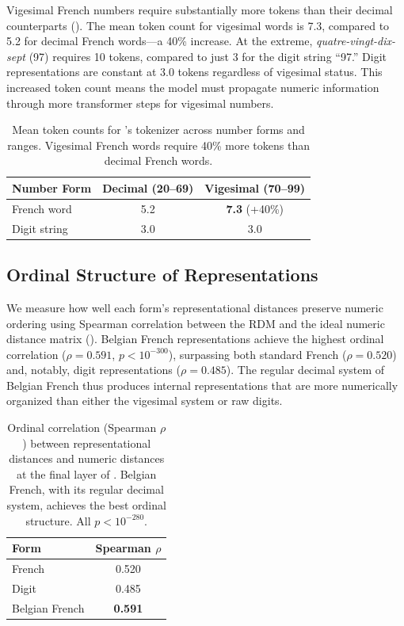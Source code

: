 Vigesimal French numbers require substantially more tokens than their decimal counterparts ().
The mean token count for vigesimal words is 7.3, compared to 5.2 for decimal French words---a 40\% increase.
At the extreme, \emph{quatre-vingt-dix-sept} (97) requires 10 tokens, compared to just 3 for the digit string ``97.''
Digit representations are constant at 3.0 tokens regardless of vigesimal status.
This increased token count means the model must propagate numeric information through more transformer steps for vigesimal numbers.

\begin{table}[t]
    \centering
    \caption{Mean token counts for \mistral's tokenizer across number forms and ranges. Vigesimal French words require 40\% more tokens than decimal French words.}
    \begin{tabular}{@{}lcc@{}}
        \toprule
        \textbf{Number Form} & \textbf{Decimal (20--69)} & \textbf{Vigesimal (70--99)} \\
        \midrule
        French word & 5.2 & \textbf{7.3} (+40\%) \\
        Digit string & 3.0 & 3.0 \\
        \bottomrule
    \end{tabular}
    \label{tab:tokens}
\end{table}

\subsection{Ordinal Structure of Representations}
\label{sec:results_ordinal}

We measure how well each form's representational distances preserve numeric ordering using Spearman correlation between the RDM and the ideal numeric distance matrix ().
Belgian French representations achieve the highest ordinal correlation ($\rho = 0.591$, $p < 10^{-300}$), surpassing both standard French ($\rho = 0.520$) and, notably, digit representations ($\rho = 0.485$).
The regular decimal system of Belgian French thus produces internal representations that are more numerically organized than either the vigesimal system or raw digits.

\begin{table}[t]
    \centering
    \caption{Ordinal correlation (Spearman $\rho$) between representational distances and numeric distances at the final layer of \mistral. Belgian French, with its regular decimal system, achieves the best ordinal structure. All $p < 10^{-280}$.}
    \begin{tabular}{@{}lc@{}}
        \toprule
        \textbf{Form} & \textbf{Spearman $\rho$} \\
        \midrule
        French & 0.520 \\
        Digit & 0.485 \\
        Belgian French & \textbf{0.591} \\
        \bottomrule
    \end{tabular}
    \label{tab:ordinal}
\end{table}

